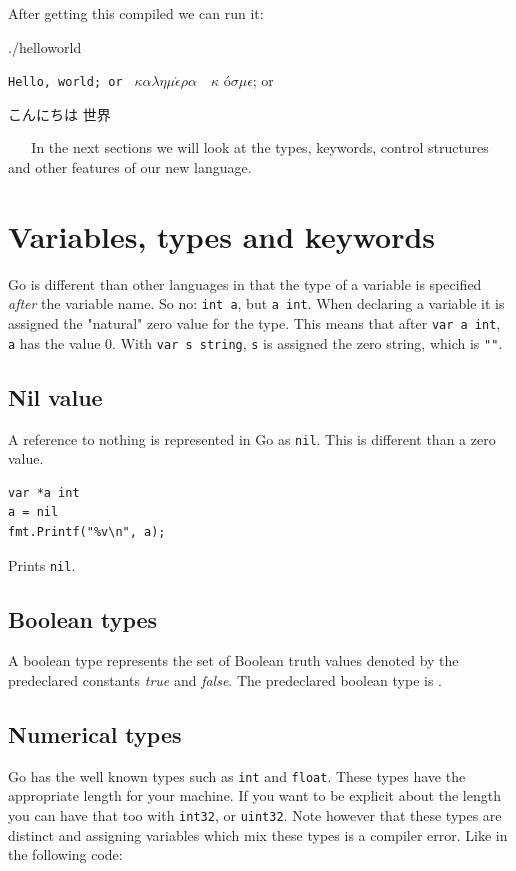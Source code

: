 After getting this compiled we can run it:
\begin{display}
\pr ./helloworld
\end{display}\texttt{Hello, world; or }%
\begin{math}\kappa\alpha\lambda\eta\mu\acute{\epsilon}\rho\alpha\hspace{1em}\kappa\end{math}%
\'o\begin{math} \sigma\mu\epsilon\end{math}; or \begin{cjk}こんにちは 世界\end{cjk}
\ \newline
\ \newline
In the next sections we will look at the types, keywords, control structures
and other features of our new language. 

\section{Variables, types and keywords}
Go is different than other languages in that the type of a variable
is specified \emph{after} the variable name. So no: 
\lstinline{int a}, but \lstinline{a int}. When declaring a variable it
is assigned the "natural" zero value for the type. This means that after
\lstinline{var a int}, \lstinline{a} has the value $0$. With
\lstinline{var s string}, \lstinline{s} is assigned the zero string,
which is \lstinline{""}.

\subsection{Nil value}
A reference to nothing is represented in Go as \lstinline{nil}. This is
different than a zero value. 

\begin{lstlisting}
var *a int
a = nil
fmt.Printf("%v\n", a);
\end{lstlisting}
Prints \lstinline{nil}.

\subsection{Boolean types}
A boolean type represents the set of Boolean truth values denoted by the
predeclared constants \emph{true} and \emph{false}. The predeclared boolean type is .

\subsection{Numerical types}
Go has the well known types such as \lstinline{int} and
\lstinline{float}. These types have the appropriate length for your
machine. If you want to be explicit about the length you can have
that too with \lstinline{int32}, or \lstinline{uint32}. Note however
that these types are distinct and assigning variables which mix
these types is a compiler error. Like in the following code:

